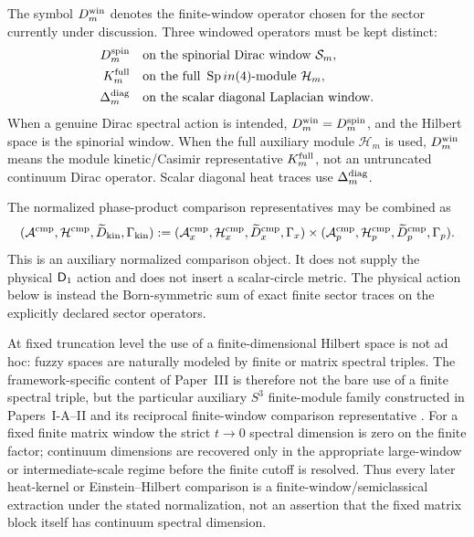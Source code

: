 \documentclass[12pt,a4paper]{article}
\begin{document}
\begin{remark}
\leavevmode\par\noindent
The symbol \(D^{\rm win}_{m}\) denotes the finite-window operator chosen
for the sector currently under discussion.  Three windowed operators must be
kept distinct:
\[
\begin{aligned}
D^{\rm spin}_{m}
&\quad\text{on the spinorial Dirac window } \mathcal S_m,\\
K^{\rm full}_{m}
&\quad\text{on the full } \operatorname{Sp}in(4)\text{-module } \mathcal H_m,\\
\Delta^{\rm diag}_{m}
&\quad\text{on the scalar diagonal Laplacian window}.
\end{aligned}
\]
When a genuine Dirac spectral action is intended,
\(D^{\rm win}_{m}=D^{\rm spin}_m\), and the Hilbert space is the spinorial
window.  When the full auxiliary module \(\mathcal H_m\) is used,
\(D^{\rm win}_{m}\) means the module kinetic/Casimir representative
\(K^{\rm full}_m\), not an untruncated continuum Dirac operator.  Scalar
diagonal heat traces use \(\Delta^{\rm diag}_m\).
\end{remark}

\begin{definition}
\label{p3:def:kin_8d_triple}
The normalized phase-product comparison representatives may be combined as
\[
 (\mathcal A^{\rm cmp},\mathcal H^{\rm cmp},\widetilde D_{\rm kin},\Gamma_{\rm kin})
 :=(\mathcal A_x^{\rm cmp},\mathcal H_x^{\rm cmp},\widetilde D_x^{\rm cmp},\Gamma_x)
 \times
 (\mathcal A_p^{\rm cmp},\mathcal H_p^{\rm cmp},\widetilde D_p^{\rm cmp},\Gamma_p).
\]
This is an auxiliary normalized comparison object.  It does not supply the
physical \(\mathsf{D}_1\) action and does not insert a scalar-circle metric.  The
physical action below is instead the Born-symmetric sum of exact finite
sector traces on the explicitly declared sector operators.
\end{definition}

\begin{remark}
At fixed truncation level the use of a finite-dimensional Hilbert space is not ad hoc: fuzzy spaces are naturally modeled by finite or matrix spectral triples. The framework-specific content of Paper~III is therefore not the bare use of a finite spectral triple, but the particular auxiliary $S^3$ finite-module family constructed in Papers~I-A--II and its reciprocal finite-window comparison representative \cite{Barrett2015,LaiTeh2012}. For a fixed finite matrix window the strict \(t\to0\) spectral dimension is zero on the finite factor; continuum dimensions are recovered only in the appropriate large-window or intermediate-scale regime before the finite cutoff is resolved.  Thus every later heat-kernel or Einstein--Hilbert comparison is a finite-window/semiclassical extraction under the stated normalization, not an assertion that the fixed matrix block itself has continuum spectral dimension.
\end{remark}
\end{document}
